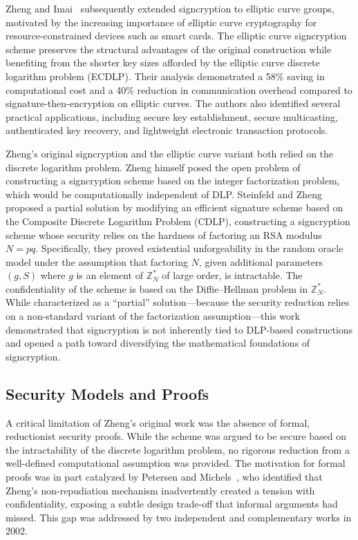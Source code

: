 \documentclass[conference]{IEEEtran}
\begin{document}
Zheng and Imai~\cite{zheng1998} subsequently extended signcryption to elliptic curve groups, motivated by the increasing importance of elliptic curve cryptography for resource-constrained devices such as smart cards. The elliptic curve signcryption scheme preserves the structural advantages of the original construction while benefiting from the shorter key sizes afforded by the elliptic curve discrete logarithm problem (ECDLP). Their analysis demonstrated a 58\% saving in computational cost and a 40\% reduction in communication overhead compared to signature-then-encryption on elliptic curves. The authors also identified several practical applications, including secure key establishment, secure multicasting, authenticated key recovery, and lightweight electronic transaction protocols.

Zheng's original signcryption and the elliptic curve variant both relied on the discrete logarithm problem. Zheng himself posed the open problem of constructing a signcryption scheme based on the integer factorization problem, which would be computationally independent of DLP. Steinfeld and Zheng~\cite{steinfeld2000} proposed a partial solution by modifying an efficient signature scheme based on the Composite Discrete Logarithm Problem (CDLP), constructing a signcryption scheme whose security relies on the hardness of factoring an RSA modulus $N = pq$. Specifically, they proved existential unforgeability in the random oracle model under the assumption that factoring $N$, given additional parameters $(g, S)$ where $g$ is an element of $\mathbb{Z}_N^*$ of large order, is intractable. The confidentiality of the scheme is based on the Diffie--Hellman problem in $\mathbb{Z}_N^*$. While characterized as a ``partial'' solution---because the security reduction relies on a non-standard variant of the factorization assumption---this work demonstrated that signcryption is not inherently tied to DLP-based constructions and opened a path toward diversifying the mathematical foundations of signcryption.

\subsection{Security Models and Proofs}

A critical limitation of Zheng's original work was the absence of formal, reductionist security proofs. While the scheme was argued to be secure based on the intractability of the discrete logarithm problem, no rigorous reduction from a well-defined computational assumption was provided. The motivation for formal proofs was in part catalyzed by Petersen and Michels~\cite{petersen1998}, who identified that Zheng's non-repudiation mechanism inadvertently created a tension with confidentiality, exposing a subtle design trade-off that informal arguments had missed. This gap was addressed by two independent and complementary works in 2002.
\end{document}
